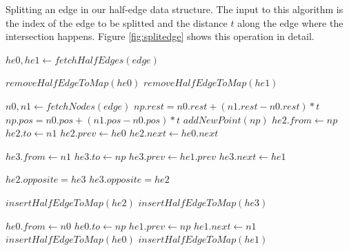 \begin{algorithm}[H]
\caption{Splitting an edge in our half-edge data structure. The input to this algorithm is the index of the edge to be splitted
and the distance $t$ along the edge where the intersection happens. Figure \ref{fig:splitedge} shows this operation in detail. }
\label{alg:edgesplit}
\begin{algorithmic}[1]	
  \STATE $he0, he1 \gets fetchHalfEdges(edge)$

  \STATE $removeHalfEdgeToMap(he0)$
  \STATE $removeHalfEdgeToMap(he1)$

  \STATE $n0, n1 \gets fetchNodes(edge)$
  \STATE $np.rest = n0.rest + (n1.rest - n0.rest) * t$
  \STATE $np.pos = n0.pos + (n1.pos - n0.pos) * t$
  \STATE $addNewPoint(np)$
  \STATE $he2.from \gets np$
  \STATE $he2.to \gets n1$
  \STATE $he2.prev \gets he0$
  \STATE $he2.next \gets he0.next$

  \STATE $he3.from \gets n1$
  \STATE $he3.to \gets np$
  \STATE $he3.prev \gets he1.prev$
  \STATE $he3.next \gets he1$

  \STATE $he2.opposite = he3$
  \STATE $he3.opposite = he2$

  \STATE $insertHalfEdgeToMap(he2)$
  \STATE $insertHalfEdgeToMap(he3)$

  \STATE $he0.from \gets n0$
  \STATE $he0.to \gets np$
  \STATE $he1.prev \gets np$
  \STATE $he1.next \gets n1$
  \STATE $insertHalfEdgeToMap(he0)$
  \STATE $insertHalfEdgeToMap(he1)$


\end{algorithmic}
\end{algorithm}



